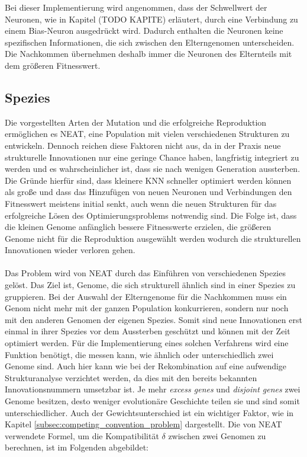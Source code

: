 Bei dieser Implementierung wird angenommen, dass der Schwellwert der Neuronen, wie in Kapitel (TODO KAPITE) erläutert, durch eine Verbindung zu einem Bias-Neuron ausgedrückt wird. Dadurch enthalten die Neuronen keine spezifischen Informationen, die sich zwischen den Elterngenomen unterscheiden. Die Nachkommen übernehmen deshalb immer die Neuronen des Elternteils mit dem größeren Fitnesswert.
\subsection{Spezies}
\label{subsec:neat_species}
Die vorgestellten Arten der Mutation und die erfolgreiche Reproduktion ermöglichen es \ac{NEAT}, eine Population mit vielen verschiedenen Strukturen zu entwickeln. Dennoch reichen diese Faktoren nicht aus, da in der Praxis neue strukturelle Innovationen nur eine geringe Chance haben, langfristig integriert zu werden und es wahrscheinlicher ist, dass sie nach wenigen Generation aussterben. Die Gründe hierfür sind, dass kleinere \ac{KNN} schneller optimiert werden können als große und dass das Hinzufügen von neuen Neuronen und Verbindungen den Fitnesswert meistens initial senkt, auch wenn die neuen Strukturen für das erfolgreiche Lösen des Optimierungsproblems notwendig sind. Die Folge ist, dass die kleinen Genome anfänglich bessere Fitnesswerte erzielen, die größeren Genome nicht für die Reproduktion ausgewählt werden wodurch die strukturellen Innovationen wieder verloren gehen.
\\\\
Das Problem wird von \ac{NEAT} durch das Einführen von verschiedenen Spezies gelöst. Das Ziel ist, Genome, die sich strukturell ähnlich sind in einer Spezies zu gruppieren. Bei der Auswahl der Elterngenome für die Nachkommen muss ein Genom nicht mehr mit der ganzen Population konkurrieren, sondern nur noch mit den anderen Genomen der eigenen Spezies. Somit sind neue Innovationen erst einmal in ihrer Spezies vor dem Aussterben geschützt und können mit der Zeit optimiert werden. Für die Implementierung eines solchen Verfahrens wird eine Funktion benötigt, die messen kann, wie ähnlich oder unterschiedlich zwei Genome sind. Auch hier kann wie bei der Rekombination auf eine aufwendige Strukturanalyse verzichtet werden, da dies mit den bereits bekannten Innovationsnummern umsetzbar ist. Je mehr \emph{excess genes} und \emph{disjoint genes} zwei Genome besitzen, desto weniger evolutionäre Geschichte teilen sie und sind somit unterschiedlicher. Auch der Gewichtsunterschied ist ein wichtiger Faktor, wie in Kapitel \ref{subsec:competing_convention_problem} dargestellt. Die von \ac{NEAT} verwendete Formel, um die Kompatibilität $\delta$ zwischen zwei Genomen zu berechnen, ist im Folgenden abgebildet:
